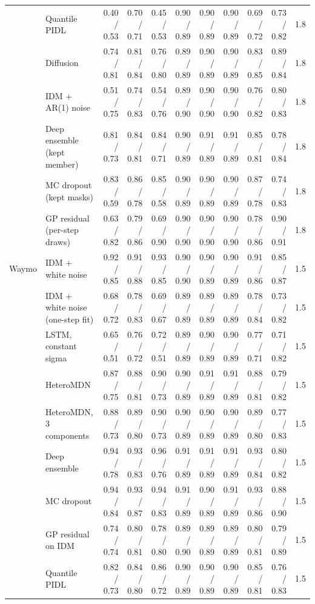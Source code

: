 \begin{longtable}{llrrrrrrrrr}
 & Quantile PIDL & 0.40 / 0.53 & 0.70 / 0.71 & 0.45 / 0.53 & 0.90 / 0.89 & 0.90 / 0.89 & 0.90 / 0.89 & 0.69 / 0.72 & 0.73 / 0.82 & 1.8 \\
 & Diffusion & 0.74 / 0.81 & 0.81 / 0.84 & 0.76 / 0.80 & 0.89 / 0.89 & 0.90 / 0.89 & 0.90 / 0.89 & 0.83 / 0.85 & 0.89 / 0.84 & 1.8 \\
 & IDM + AR(1) noise & 0.51 / 0.75 & 0.74 / 0.83 & 0.54 / 0.76 & 0.89 / 0.90 & 0.90 / 0.90 & 0.90 / 0.90 & 0.76 / 0.82 & 0.80 / 0.83 & 1.8 \\
 & Deep ensemble (kept member) & 0.81 / 0.73 & 0.84 / 0.81 & 0.84 / 0.71 & 0.90 / 0.89 & 0.91 / 0.89 & 0.91 / 0.89 & 0.85 / 0.81 & 0.78 / 0.84 & 1.8 \\
 & MC dropout (kept masks) & 0.83 / 0.59 & 0.86 / 0.78 & 0.85 / 0.58 & 0.90 / 0.89 & 0.90 / 0.89 & 0.90 / 0.89 & 0.87 / 0.78 & 0.74 / 0.83 & 1.8 \\
 & GP residual (per-step draws) & 0.63 / 0.82 & 0.79 / 0.86 & 0.69 / 0.90 & 0.90 / 0.90 & 0.90 / 0.90 & 0.90 / 0.90 & 0.78 / 0.86 & 0.90 / 0.91 & 1.8 \\
\midrule
Waymo & IDM + white noise & 0.92 / 0.85 & 0.91 / 0.88 & 0.93 / 0.85 & 0.90 / 0.90 & 0.90 / 0.89 & 0.90 / 0.89 & 0.91 / 0.86 & 0.85 / 0.87 & 1.5 \\
 & IDM + white noise (one-step fit) & 0.68 / 0.72 & 0.78 / 0.83 & 0.69 / 0.67 & 0.89 / 0.89 & 0.89 / 0.89 & 0.89 / 0.89 & 0.78 / 0.84 & 0.73 / 0.82 & 1.5 \\
 & LSTM, constant sigma & 0.65 / 0.51 & 0.76 / 0.72 & 0.72 / 0.51 & 0.89 / 0.89 & 0.90 / 0.89 & 0.90 / 0.89 & 0.77 / 0.71 & 0.71 / 0.82 & 1.5 \\
 & HeteroMDN & 0.87 / 0.75 & 0.88 / 0.81 & 0.90 / 0.73 & 0.90 / 0.89 & 0.91 / 0.89 & 0.91 / 0.89 & 0.88 / 0.81 & 0.79 / 0.82 & 1.5 \\
 & HeteroMDN, 3 components & 0.88 / 0.73 & 0.89 / 0.80 & 0.90 / 0.73 & 0.90 / 0.89 & 0.90 / 0.89 & 0.90 / 0.89 & 0.89 / 0.80 & 0.77 / 0.83 & 1.5 \\
 & Deep ensemble & 0.94 / 0.78 & 0.93 / 0.83 & 0.96 / 0.76 & 0.91 / 0.89 & 0.91 / 0.89 & 0.91 / 0.89 & 0.93 / 0.84 & 0.80 / 0.82 & 1.5 \\
 & MC dropout & 0.94 / 0.84 & 0.93 / 0.87 & 0.94 / 0.83 & 0.91 / 0.89 & 0.90 / 0.89 & 0.91 / 0.89 & 0.93 / 0.86 & 0.88 / 0.90 & 1.5 \\
 & GP residual on IDM & 0.74 / 0.74 & 0.80 / 0.81 & 0.78 / 0.80 & 0.89 / 0.90 & 0.89 / 0.89 & 0.89 / 0.89 & 0.80 / 0.81 & 0.79 / 0.89 & 1.5 \\
 & Quantile PIDL & 0.82 / 0.73 & 0.84 / 0.80 & 0.86 / 0.72 & 0.90 / 0.89 & 0.90 / 0.89 & 0.90 / 0.89 & 0.85 / 0.81 & 0.76 / 0.83 & 1.5 \\

\end{longtable}
